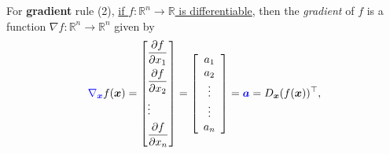 \documentclass[12pt,thmsa]{article}
\begin{document}
\begin{itemize}
	For \textbf{gradient} rule (2), \underline{if \(f: \mathbb{R}^{n} \rightarrow \mathbb{R}\) is differentiable}, then the \textit{gradient} of \(f\) is a function \(\nabla f: \mathbb{R}^{n} \rightarrow \mathbb{R}^{n}\) given by
	\[  {\color{blue}{\nabla}_{\boldsymbol{x}} } f(\boldsymbol{x}) =
	\left[\begin{aligned}
		&\frac{\partial f}{\partial x_{1}} \\ 
		&\frac{\partial f}{\partial x_{2}} \\  
		&\vdots \\  
		&\frac{\partial f}{\partial x_{n}}  
	\end{aligned}\right]
	= \left[ \begin{array}{c} a_1 \\ a_2 \\ \vdots \\ \vdots \\ a_n \end{array} \right]
	= {\color{blue}{ \boldsymbol{a} }}
	= D_{\boldsymbol{x}}( f(\boldsymbol{x})  )^{\top},
	\] 


\end{itemize}
\end{document}
